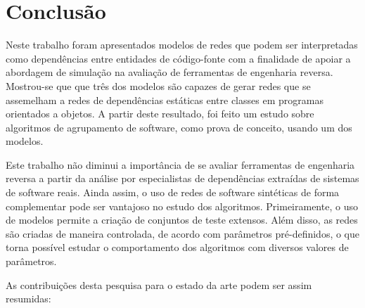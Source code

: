 

\chapter{Conclusão} \label{cap:conclusao}

Neste trabalho foram apresentados modelos de redes que podem ser interpretadas como dependências entre entidades de código-fonte com a finalidade de apoiar a abordagem de simulação na avaliação de ferramentas de engenharia reversa. Mostrou-se que que três dos modelos são capazes de gerar redes que se assemelham a redes de dependências estáticas entre classes em programas orientados a objetos. A partir deste resultado, foi feito um estudo sobre algoritmos de agrupamento de software, como prova de conceito, usando um dos modelos.


Este trabalho não diminui a importância de se avaliar ferramentas de engenharia reversa a partir da análise por especialistas de dependências extraídas de sistemas de software reais. Ainda assim, o uso de redes de software sintéticas de forma complementar pode ser vantajoso no estudo dos algoritmos. Primeiramente, o uso de modelos permite a criação de conjuntos de teste extensos. Além disso, as redes são criadas de maneira controlada, de acordo com parâmetros pré-definidos, o que torna possível estudar o comportamento dos algoritmos com diversos valores de parâmetros.


As contribuições desta pesquisa para o estado da arte podem ser assim resumidas:

